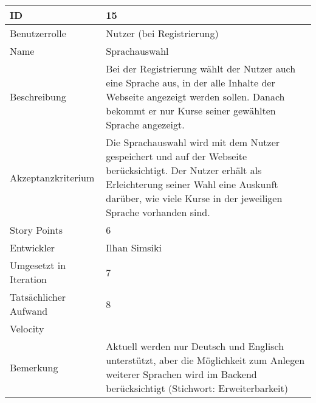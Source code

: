 \begin{tabularx}{\textwidth}{|p{}|X|}
	\hline
	ID & 15\\
	\hline
	Benutzerrolle & Nutzer (bei Registrierung)\\
	\hline
	Name & Sprachauswahl\\
	\hline
	Beschreibung & Bei der Registrierung wählt der Nutzer auch eine Sprache aus, in der alle Inhalte der Webseite angezeigt werden sollen. Danach bekommt er nur Kurse seiner gewählten Sprache angezeigt.\\
	\hline
	Akzeptanzkriterium & Die Sprachauswahl wird mit dem Nutzer gespeichert und auf der Webseite berücksichtigt. Der Nutzer erhält als  Erleichterung seiner Wahl eine Auskunft darüber, wie viele Kurse in der jeweiligen Sprache vorhanden sind.\\
	\hline
	Story Points & 6\\
	\hline
	Entwickler & Ilhan Simsiki\\
	\hline
	Umgesetzt in Iteration & 7\\ 
	\hline
	Tatsächlicher Aufwand & 8\\
	\hline
	Velocity & \\
	\hline
	Bemerkung & Aktuell werden nur Deutsch und Englisch unterstützt, aber die Möglichkeit zum Anlegen weiterer Sprachen wird im Backend berücksichtigt (Stichwort: Erweiterbarkeit)\\
	\hline
\end{tabularx}
\vspace{20pt}
